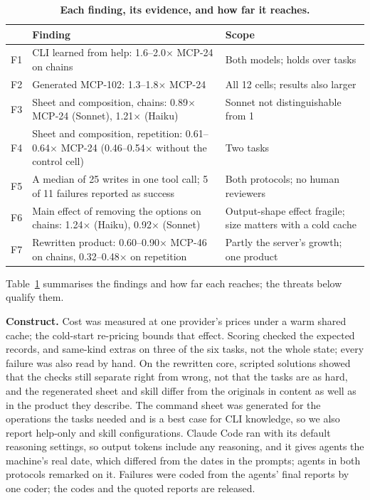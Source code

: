\documentclass[sigconf,nonacm]{acmart}
\newcommand{\cfg}[1]{\textsf{#1}}
\newcommand{\finding}[1]{\textbf{#1}}
\begin{document}
\begin{table}[t]
\caption{\textbf{Each finding, its evidence, and how far it reaches.}}
\label{tab:findings}
\small
\setlength{\tabcolsep}{3pt}
\begin{tabularx}{\columnwidth}{@{}l>{\raggedright\arraybackslash}X>{\raggedright\arraybackslash}p{2.35cm}@{}}
\toprule
 & \textbf{Finding} & \textbf{Scope} \\
\midrule
F1 & CLI learned from help: 1.6--2.0$\times$ \cfg{MCP-24} on chains & Both models; holds over tasks \\
F2 & Generated \cfg{MCP-102}: 1.3--1.8$\times$ \cfg{MCP-24} & All 12 cells; results also larger \\
F3 & Sheet and composition, chains: 0.89$\times$ \cfg{MCP-24} (Sonnet), 1.21$\times$ (Haiku) & Sonnet not distinguishable from 1 \\
F4 & Sheet and composition, repetition: 0.61--0.64$\times$ \cfg{MCP-24} (0.46--0.54$\times$ without the control cell) & Two tasks \\
F5 & A median of 25 writes in one tool call; 5 of 11 failures reported as success & Both protocols; no human reviewers \\
F6 & Main effect of removing the options on chains: 1.24$\times$ (Haiku), 0.92$\times$ (Sonnet) & Output-shape effect fragile; size matters with a cold cache \\
F7 & Rewritten product: 0.60--0.90$\times$ \cfg{MCP-46} on chains, 0.32--0.48$\times$ on repetition & Partly the server's growth; one product \\
\bottomrule
\end{tabularx}
\end{table}

Table~\ref{tab:findings} summarises the findings and how far each reaches; the threats below qualify them.

\finding{Construct.} Cost was measured at one provider's prices under a warm shared cache; the cold-start re-pricing bounds that effect. Scoring checked the expected records, and same-kind extras on three of the six tasks, not the whole state; every failure was also read by hand. On the rewritten core, scripted solutions showed that the checks still separate right from wrong, not that the tasks are as hard, and the regenerated sheet and skill differ from the originals in content as well as in the product they describe. The command sheet was generated for the operations the tasks needed and is a best case for CLI knowledge, so we also report help-only and skill configurations. Claude Code ran with its default reasoning settings, so output tokens include any reasoning, and it gives agents the machine's real date, which differed from the dates in the prompts; agents in both protocols remarked on it. Failures were coded from the agents' final reports by one coder; the codes and the quoted reports are released.
\end{document}
